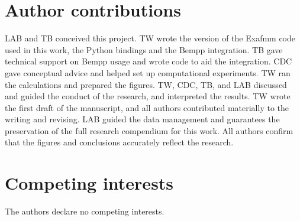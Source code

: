 \documentclass[twocolumn]{article}
\begin{document}
\section*{Author contributions}
LAB and TB conceived this project. 
TW wrote the version of the Exafmm code used in this work, the Python bindings and the Bempp integration. 
TB gave technical support on Bempp usage and wrote code to aid the integration.
CDC gave conceptual advice and helped set up computational experiments.
TW ran the calculations and prepared the figures.
TW, CDC, TB, and LAB discussed and guided the conduct of the research, and interpreted the results.
TW wrote the first draft of the manuscript, and all authors contributed materially to the writing and revising.
LAB guided the data management and guarantees the preservation of the full research compendium for this work. 
All authors confirm that the figures and conclusions accurately reflect the research.


\section*{Competing interests}
The authors declare no competing interests.

\appendix

\end{document}
